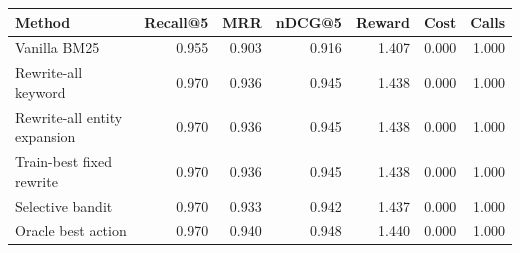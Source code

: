 \begin{tabular}{lrrrrrr}
\toprule
Method & Recall@5 & MRR & nDCG@5 & Reward & Cost & Calls \\
\midrule
Vanilla BM25 & 0.955 & 0.903 & 0.916 & 1.407 & 0.000 & 1.000 \\
Rewrite-all keyword & 0.970 & 0.936 & 0.945 & 1.438 & 0.000 & 1.000 \\
Rewrite-all entity expansion & 0.970 & 0.936 & 0.945 & 1.438 & 0.000 & 1.000 \\
Train-best fixed rewrite & 0.970 & 0.936 & 0.945 & 1.438 & 0.000 & 1.000 \\
Selective bandit & 0.970 & 0.933 & 0.942 & 1.437 & 0.000 & 1.000 \\
Oracle best action & 0.970 & 0.940 & 0.948 & 1.440 & 0.000 & 1.000 \\
\bottomrule
\end{tabular}
